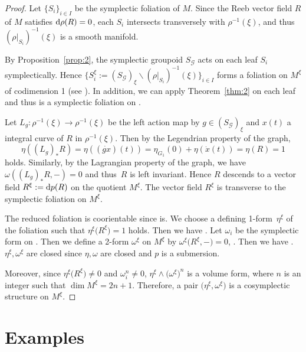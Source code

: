 \documentclass[pdftex]{sigma}
\numberwithin{equation}{section}
\begin{document}
\begin{proof}
 Let $\{S_i\}_{i\in I}$ be the symplectic foliation of $M$. Since the Reeb vector field $R$ of $M$ satisfies ${\rm d}\rho(R)=0$, each $S_i$ intersects transversely with $\rho^{-1}(\xi)$, and thus $(\rho|_{S_i})^{-1}(\xi)$ is a smooth manifold.

 By Proposition~\ref{prop:2}, the symplectic groupoid $S_\mathcal{G}$ acts on each leaf $S_i$ symplectically. Hence $\big\{S^\xi_i:=(S_{\mathcal{G}})_\xi\backslash (\rho|_{S_i})^{-1}(\xi)\big\}_{i\in I}$ forms a foliation on $M^\xi$ of codimension 1 (see \cite[Section 1.3]{moerdijk2003introduction}). In addition, we can apply Theorem~\ref{thm:2} on each leaf and thus  is a symplectic foliation on .

 Let $L_g\colon\rho^{-1}(\xi)\to\rho^{-1}(\xi)$ be the left action map by $g\in(S_{\mathcal{G}})_\xi$ and $x(t)$ a integral curve of $R$ in $\rho^{-1}(\xi)$. Then by the Legendrian property of the graph,
 \[\eta((L_g)_\ast R)=\eta((\dot{gx})(t))=\eta_{G_1}(0)+\eta(\dot{x}(t))=\eta(R)=1\]holds. Similarly, by the Lagrangian property of the graph, we have $\omega((L_g)_\ast R,-)=0$ and thus~$R$ is left invariant. Hence $R$ descends to a vector field ${R}^\xi:={\rm d}p(R)$ on the quotient $M^\xi$. The vector field ${R}^\xi$ is transverse to the symplectic foliation on $M^\xi$.

 The reduced foliation  is coorientable since  is. We choose a defining 1-form~$\eta^\xi$ of the foliation  such that $\eta^\xi\bigl(R^\xi\bigr)=1$ holds. Then we have . Let $\omega_i$ be the symplectic form on . Then we define a 2-form $\omega^\xi$ on $M^\xi$ by
 $\omega^\xi\bigl(R^\xi,-\bigr)=0$, . Then we have . $\eta^\xi,\omega^\xi$ are closed since $\eta,\omega$ are closed and $p$ is a submersion.

 Moreover, since $\eta^\xi\bigl(R^\xi\bigr)\neq0$ and $\omega_i^n\neq0$, $\eta^\xi\wedge\bigl(\omega^\xi\bigr)^n$ is a volume form, where $n$ is an integer such that $\dim M^\xi=2n+1$. Therefore, a pair $\bigl(\eta^\xi,\omega^\xi\bigr)$ is a cosymplectic structure on $M^\xi$.
\end{proof}

\section{Examples}\label{examples}
\end{document}
